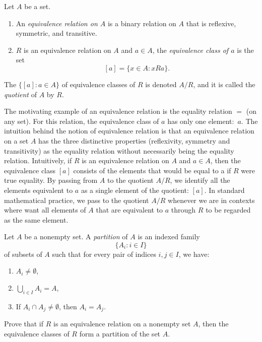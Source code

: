 \begin{definition}
  \label{def:eqreq}
  Let $A$ be a set.
  \begin{enumerate}
  \item
    An \emph{equivalence relation on $A$}  is a binary relation on $A$ that is reflexive, symmetric, and transitive.
  \item
    $R$ is an equivalence relation on $A$ and $a\in A$, the \emph{equivalence class of $a$} is the set
    \[
      [a]=\{ x\in A :  xRa\}.
    \]
  \end{enumerate}
  The $\{[a] : a\in A\}$ of equivalence classes of $R$ is denoted $A/R$, and it is called the \emph{quotient} of $A$ by $R$.
\end{definition}

The motivating example of an equivalence relation is the equality relation $=$ (on any set).
For this relation, the equivalence class of $a$ has only one element:~$a$.
The intuition behind the notion of equivalence relation is that an equivalence relation on a set $A$ has the three distinctive properties (reflexivity, symmetry and transitivity) as the equality relation without necessarily being the equality relation.
Intuitively, if $R$ is an equivalence relation on $A$ and $a\in A$,
then the equivalence class $[a]$ consists of the elements that would be equal to a if  $R$ were true equality.
By passing from $A$ to the quotient $A/R$, we identify all the elements equivalent to $a$ as a single element of the quotient:
$[a]$.
In standard mathematical practice, we pass to the quotient $A/R$ whenever we are in contexts where want all elements of $A$ that are equivalent to $a$ through $R$ to be regarded as the same element.

\begin{definition}
  \label{def:part}
  Let $A$ be a nonempty set.
  A \emph{partition} of $A$ is an indexed family
  \[
    \{A_i : i\in I\}
  \]
  of subsets of $A$ such that for every pair of indices $i,j\in I$, we have:
  \begin{enumerate}
  \item
    $A_i\neq \emptyset$,
  \item
    $\bigcup_{i\in I} A_i=A$,
  \item
    If $A_i\cap A_j\neq\emptyset$, then $A_i=A_j$.
  \end{enumerate}
\end{definition}

\begin{exercise}
  Prove that if $R$ is an equivalence relation on a nonempty set $A$, then the equivalence classes of $R$ form a partition of the set $A$.
\end{exercise}

